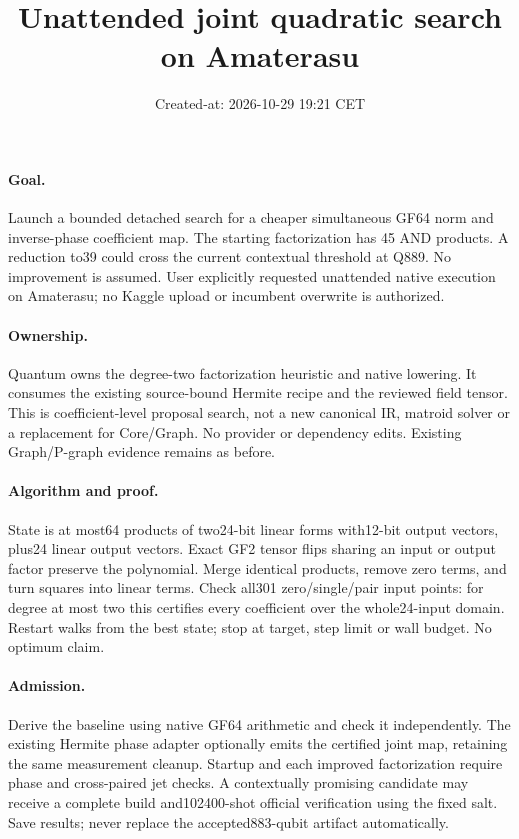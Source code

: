 \documentclass{article}
\title{Unattended joint quadratic search on Amaterasu}
\date{Created-at: 2026-10-29 19:21 CET}
\begin{document}
\maketitle
\paragraph{Goal.} Launch a bounded detached search for a cheaper simultaneous
GF64 norm and inverse-phase coefficient map. The starting factorization has
45 AND products. A reduction to39 could cross the current contextual threshold
at Q889. No improvement is assumed. User explicitly requested unattended native
execution on Amaterasu; no Kaggle upload or incumbent overwrite is authorized.
\paragraph{Ownership.} Quantum owns the degree-two factorization heuristic and
native lowering. It consumes the existing source-bound Hermite recipe and the
reviewed field tensor. This is coefficient-level proposal search, not a new
canonical IR, matroid solver or a replacement for Core/Graph. No provider or
dependency edits. Existing Graph/P-graph evidence remains as before.
\paragraph{Algorithm and proof.} State is at most64 products of two24-bit
linear forms with12-bit output vectors, plus24 linear output vectors. Exact
GF2 tensor flips sharing an input or output factor preserve the polynomial.
Merge identical products, remove zero terms, and turn squares into linear
terms. Check all301 zero/single/pair input points: for degree at most two this
certifies every coefficient over the whole24-input domain. Restart walks from
the best state; stop at target, step limit or wall budget. No optimum claim.
\paragraph{Admission.} Derive the baseline using native GF64 arithmetic and
check it independently. The existing Hermite phase adapter optionally emits
the certified joint map, retaining the same measurement cleanup. Startup and
each improved factorization require phase and cross-paired jet checks. A
contextually promising candidate may receive a complete build and102400-shot
official verification using the fixed salt. Save results; never replace the
accepted883-qubit artifact automatically.
\end{document}
